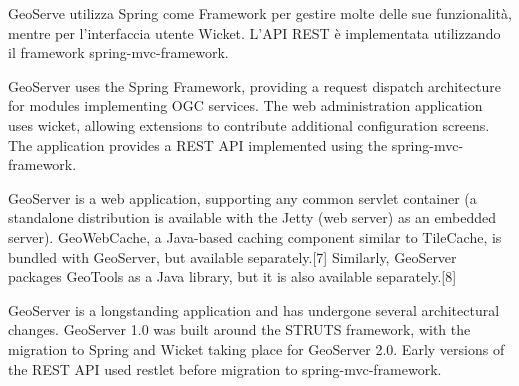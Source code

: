 GeoServe utilizza Spring come Framework per gestire molte delle sue funzionalità, mentre per l'interfaccia utente  Wicket. L'API REST è implementata utilizzando il framework spring-mvc-framework.



GeoServer uses the Spring Framework, providing a request dispatch architecture for modules implementing OGC services. The web administration application uses wicket, allowing extensions to contribute additional configuration screens. The application provides a REST API implemented using the spring-mvc-framework.

GeoServer is a web application, supporting any common servlet container (a standalone distribution is available with the Jetty (web server) as an embedded server). GeoWebCache, a Java-based caching component similar to TileCache, is bundled with GeoServer, but available separately.[7] Similarly, GeoServer packages GeoTools as a Java library, but it is also available separately.[8]

GeoServer is a longstanding application and has undergone several architectural changes. GeoServer 1.0 was built around the STRUTS framework, with the migration to Spring and Wicket taking place for GeoServer 2.0. Early versions of the REST API used restlet before migration to spring-mvc-framework.

